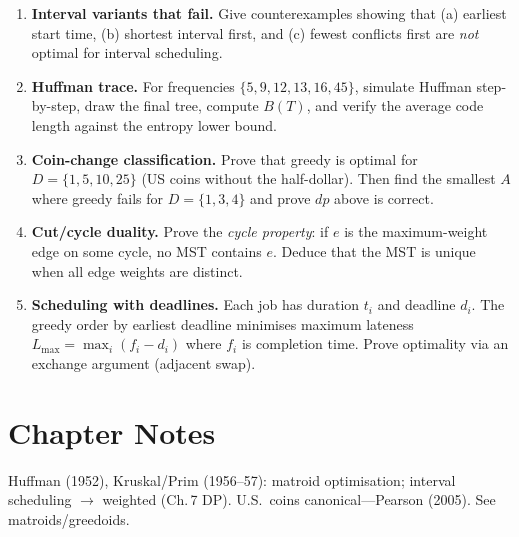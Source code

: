 \begin{enumerate}[label=E\arabic*.]
    \item \textbf{Interval variants that fail.} Give counterexamples showing that (a) earliest start time, (b) shortest interval first, and (c) fewest conflicts first are \emph{not} optimal for interval scheduling.
    \item \textbf{Huffman trace.} For frequencies $\{5,9,12,13,16,45\}$, simulate Huffman step-by-step, draw the final tree, compute $B(T)$, and verify the average code length against the entropy lower bound.
    \item \textbf{Coin-change classification.} Prove that greedy is optimal for $D=\{1,5,10,25\}$ (US coins without the half-dollar). Then find the smallest $A$ where greedy fails for $D=\{1,3,4\}$ and prove $dp$ above is correct.
    \item \textbf{Cut/cycle duality.} Prove the \emph{cycle property}: if $e$ is the maximum-weight edge on some cycle, no MST contains $e$. Deduce that the MST is unique when all edge weights are distinct.
    \item \textbf{Scheduling with deadlines.} Each job has duration $t_i$ and deadline $d_i$. The greedy order by earliest deadline minimises maximum lateness $L_{\max}=\max_i(f_i-d_i)$ where $f_i$ is completion time. Prove optimality via an exchange argument (adjacent swap).
\end{enumerate}

\section*{Chapter Notes}
Huffman (1952), Kruskal/Prim (1956--57): matroid optimisation; interval scheduling $\to$ weighted (Ch.\,7 DP). U.S.\ coins canonical---Pearson (2005). See matroids/greedoids.

